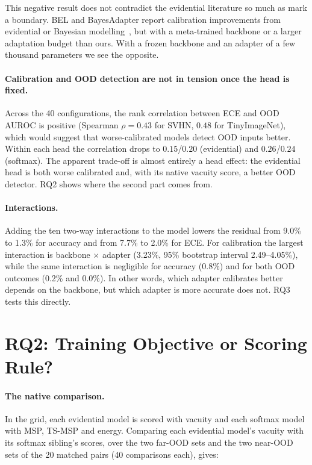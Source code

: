 This negative result does not contradict the evidential literature so much as mark a boundary. BEL and
BayesAdapter report calibration improvements from evidential or Bayesian
modelling~\cite{linghu2022bel,moralesalvarez2026bayesadapter}, but with a meta-trained backbone or a
larger adaptation budget than ours. With a frozen backbone and an adapter of a few thousand parameters
we see the opposite.

\paragraph{Calibration and OOD detection are not in tension once the head is fixed.} Across the 40
configurations, the rank correlation between ECE and OOD AUROC is positive (Spearman $\rho = 0.43$ for
SVHN, $0.48$ for TinyImageNet), which would suggest that worse-calibrated models detect OOD inputs better.
Within each head the correlation drops to $0.15$/$0.20$ (evidential) and $0.26$/$0.24$ (softmax). The
apparent trade-off is almost entirely a head effect: the evidential head is both worse calibrated and,
with its native vacuity score, a better OOD detector. RQ2 shows where the second part comes from.

\paragraph{Interactions.} Adding the ten two-way interactions to the model lowers the residual from 9.0\%
to 1.3\% for accuracy and from 7.7\% to 2.0\% for ECE. For calibration the largest interaction is
backbone $\times$ adapter (3.23\%, 95\% bootstrap interval 2.49--4.05\%), while the same interaction is
negligible for accuracy (0.8\%) and for both OOD outcomes (0.2\% and 0.0\%). In other words, which adapter
calibrates better depends on the backbone, but which adapter is more accurate does not. RQ3 tests this
directly.

\section{RQ2: Training Objective or Scoring Rule?}
\label{sec:rq2}

\paragraph{The native comparison.} In the grid, each evidential model is scored with vacuity and each
softmax model with MSP, TS-MSP and energy. Comparing each evidential model's vacuity with its softmax
sibling's scores, over the two far-OOD sets and the two near-OOD sets of the 20 matched pairs (40
comparisons each), gives:

